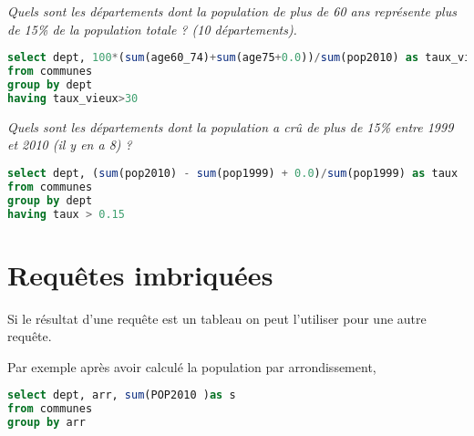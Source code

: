 \begin{Exercise}
\it Quels sont les départements dont la population de plus de 60 ans représente plus de 15\% de la population totale ? (10 départements).
\end{Exercise}
\begin{Answer}
\begin{lstlisting}[language=SQL]
select dept, 100*(sum(age60_74)+sum(age75+0.0))/sum(pop2010) as taux_vieux
from communes
group by dept
having taux_vieux>30
\end{lstlisting}
\end{Answer}
\begin{Exercise}
\it Quels sont les départements dont la population a crû de plus de 15\% entre 1999 et 2010 (il y en a 8) ?
\end{Exercise}
\begin{Answer}
\begin{lstlisting}[language=SQL]
select dept, (sum(pop2010) - sum(pop1999) + 0.0)/sum(pop1999) as taux
from communes
group by dept
having taux > 0.15
\end{lstlisting}
\end{Answer}
\newpage
\section{Requêtes imbriquées}
Si le résultat d'une requête est un tableau on peut l'utiliser pour une autre requête.

Par exemple après avoir calculé la population par arrondissement,
\begin{lstlisting}[language=SQL]
select dept, arr, sum(POP2010 )as s
from communes
group by arr
\end{lstlisting}

